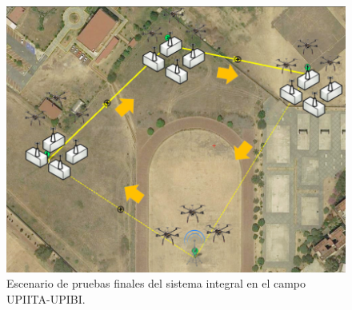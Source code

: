 \begin{figure}[H]
    \centering
    \includegraphics[width=0.75\linewidth]{imagenes/3.png}
    \caption{Escenario de pruebas finales del sistema integral en el campo UPIITA-UPIBI.}
    \label{fig:enter-label}
\end{figure}